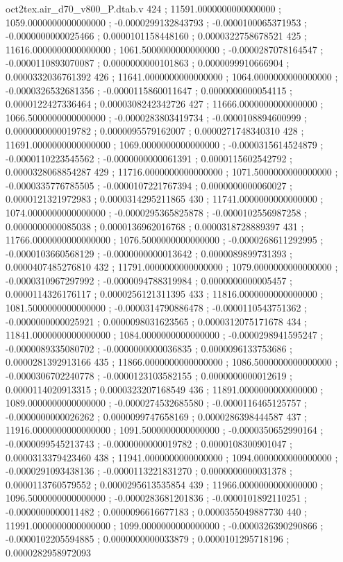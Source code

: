 \begin{filecontents}[overwrite]{oct2tex.air_d70_v800_P.dtab.v}
424 ; 11591.0000000000000000 ; 1059.0000000000000000 ; -0.0000299132843793 ; -0.0000100065371953 ; -0.0000000000025466 ; 0.0000101158448160 ; 0.0000322758678521
425 ; 11616.0000000000000000 ; 1061.5000000000000000 ; -0.0000287078164547 ; -0.0000110893070087 ; 0.0000000000101863 ; 0.0000099910666904 ; 0.0000332036761392
426 ; 11641.0000000000000000 ; 1064.0000000000000000 ; -0.0000326532681356 ; -0.0000115860011647 ; 0.0000000000054115 ; 0.0000122427336464 ; 0.0000308242342726
427 ; 11666.0000000000000000 ; 1066.5000000000000000 ; -0.0000283803419734 ; -0.0000108894600999 ; 0.0000000000019782 ; 0.0000095579162007 ; 0.0000271748340310
428 ; 11691.0000000000000000 ; 1069.0000000000000000 ; -0.0000315614524879 ; -0.0000110223545562 ; -0.0000000000061391 ; 0.0000115602542792 ; 0.0000328068854287
429 ; 11716.0000000000000000 ; 1071.5000000000000000 ; -0.0000335776785505 ; -0.0000107221767394 ; 0.0000000000060027 ; 0.0000121321972983 ; 0.0000314295211865
430 ; 11741.0000000000000000 ; 1074.0000000000000000 ; -0.0000295365825878 ; -0.0000102556987258 ; 0.0000000000085038 ; 0.0000136962016768 ; 0.0000318728889397
431 ; 11766.0000000000000000 ; 1076.5000000000000000 ; -0.0000268611292995 ; -0.0000103660568129 ; -0.0000000000013642 ; 0.0000089899731393 ; 0.0000407485276810
432 ; 11791.0000000000000000 ; 1079.0000000000000000 ; -0.0000310967297992 ; -0.0000094788319984 ; 0.0000000000005457 ; 0.0000114326176117 ; 0.0000256121311395
433 ; 11816.0000000000000000 ; 1081.5000000000000000 ; -0.0000314790886478 ; -0.0000110543751362 ; -0.0000000000025921 ; 0.0000098031623565 ; 0.0000312075171678
434 ; 11841.0000000000000000 ; 1084.0000000000000000 ; -0.0000298941595247 ; -0.0000089335080702 ; -0.0000000000036835 ; 0.0000096133753686 ; 0.0000281392913166
435 ; 11866.0000000000000000 ; 1086.5000000000000000 ; -0.0000306702240778 ; -0.0000123103582155 ; 0.0000000000012619 ; 0.0000114020913315 ; 0.0000323207168549
436 ; 11891.0000000000000000 ; 1089.0000000000000000 ; -0.0000274532685580 ; -0.0000116465125757 ; -0.0000000000026262 ; 0.0000099747658169 ; 0.0000286398444587
437 ; 11916.0000000000000000 ; 1091.5000000000000000 ; -0.0000350652990164 ; -0.0000099545213743 ; -0.0000000000019782 ; 0.0000108300901047 ; 0.0000313379423460
438 ; 11941.0000000000000000 ; 1094.0000000000000000 ; -0.0000291093438136 ; -0.0000113221831270 ; 0.0000000000031378 ; 0.0000113760579552 ; 0.0000295613535854
439 ; 11966.0000000000000000 ; 1096.5000000000000000 ; -0.0000283681201836 ; -0.0000101892110251 ; -0.0000000000011482 ; 0.0000096616677183 ; 0.0000355049887730
440 ; 11991.0000000000000000 ; 1099.0000000000000000 ; -0.0000326390290866 ; -0.0000102205594885 ; 0.0000000000033879 ; 0.0000101295718196 ; 0.0000282958972093

\end{filecontents}

